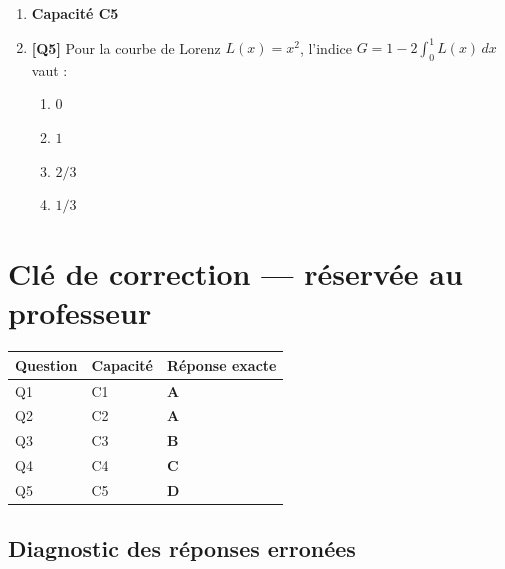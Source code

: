 \begin{enumerate}
\item[] \textbf{Capacité C5}

\item \textbf{[Q5]} Pour la courbe de Lorenz $L(x)=x^2$, l'indice $G=1-2\int_0^1L(x)\,dx$ vaut :
  \begin{enumerate}[label=\Alph*.]
    \item $0$
    \item $1$
    \item $2/3$
    \item $1/3$
  \end{enumerate}

\end{enumerate}

\ifnxVersionProfesseur
\clearpage
\section*{Clé de correction — réservée au professeur}

\begin{center}
\begin{tabular}{lll}
\hline
Question & Capacité & Réponse exacte \\
\hline
Q1 & C1 & \textbf{A} \\
Q2 & C2 & \textbf{A} \\
Q3 & C3 & \textbf{B} \\
Q4 & C4 & \textbf{C} \\
Q5 & C5 & \textbf{D} \\
\hline
\end{tabular}
\end{center}

\subsection*{Diagnostic des réponses erronées}

